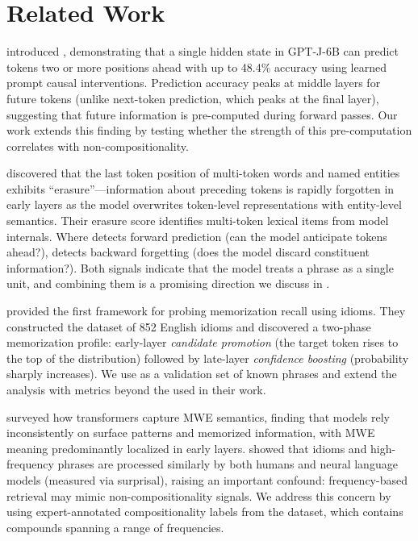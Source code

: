 \section{Related Work}
\label{sec:related}

\citet{pal2023future} introduced \futurelens, demonstrating that a single hidden state in GPT-J-6B can predict tokens two or more positions ahead with up to 48.4\% accuracy using learned prompt causal interventions.
Prediction accuracy peaks at middle layers for future tokens (unlike next-token prediction, which peaks at the final layer), suggesting that future information is pre-computed during forward passes.
Our work extends this finding by testing whether the strength of this pre-computation correlates with non-compositionality.

\citet{feucht2024token} discovered that the last token position of multi-token words and named entities exhibits ``erasure''---information about preceding tokens is rapidly forgotten in early layers as the model overwrites token-level representations with entity-level semantics.
Their erasure score identifies multi-token lexical items from model internals.
Where \futurelens detects forward prediction (can the model anticipate tokens ahead?), \tokenerasure detects backward forgetting (does the model discard constituent information?).
Both signals indicate that the model treats a phrase as a single unit, and combining them is a promising direction we discuss in .

\citet{haviv2022understanding} provided the first framework for probing memorization recall using idioms.
They constructed the \idiomem dataset of 852 English idioms and discovered a two-phase memorization profile: early-layer \emph{candidate promotion} (the target token rises to the top of the distribution) followed by late-layer \emph{confidence boosting} (probability sharply increases).
We use \idiomem as a validation set of known \noncomp phrases and extend the analysis with \futurelens metrics beyond the \logitlens used in their work.

\citet{miletic2024systematic} surveyed how transformers capture MWE semantics, finding that models rely inconsistently on surface patterns and memorized information, with MWE meaning predominantly localized in early layers.
\citet{rambelli2023frequent} showed that idioms and high-frequency \comp phrases are processed similarly by both humans and neural language models (measured via surprisal), raising an important confound: frequency-based retrieval may mimic non-compositionality signals.
We address this concern by using expert-annotated compositionality labels from the \farahmand dataset, which contains compounds spanning a range of frequencies.

